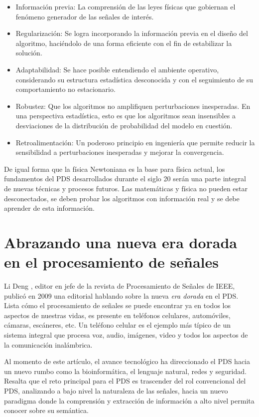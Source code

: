 \documentclass[11pt, twocolumn]{article}
\begin{document}
\begin{itemize}
    \item Información previa: La comprensión de las leyes físicas que gobiernan el fenómeno generador de las señales de interés.
    \item Regularización: Se logra incorporando la información previa en el diseño del algoritmo, haciéndolo de una forma eficiente con el fin de estabilizar la solución.
    \item Adaptabilidad: Se hace posible entendiendo el ambiente operativo, considerando su estructura estadística desconocida y con el seguimiento de su comportamiento no estacionario.
    \item Robustez: Que los algoritmos no amplifiquen perturbaciones inesperadas. En una perspectiva estadística, esto es que los algoritmos sean insensibles a desviaciones de la distribución de probabilidad del modelo en cuestión.
    \item Retroalimentación: Un poderoso principio en ingeniería que permite reducir la sensibilidad a perturbaciones inesperadas y mejorar la convergencia.
\end{itemize}

De igual forma que la física Newtoniana es la base para física actual, los fundamentos del PDS desarrollados durante el siglo 20 serán una parte integral de nuevas técnicas y procesos futuros. Las matemáticas y física no pueden estar desconectados, se deben probar los algoritmos con información real y se debe aprender de esta información.

\section{Abrazando una nueva era dorada en el procesamiento de señales}
Li Deng \cite{golden_age}, editor en jefe de la revista de Procesamiento de Señales de IEEE, publicó en 2009 una editorial hablando sobre la nueva \textit{era dorada} en el PDS. Lista cómo el procesamiento de señales se puede encontrar ya en todos los aspectos de nuestras vidas, es presente en teléfonos celulares, automóviles, cámaras, escáneres, etc. Un teléfono celular es el ejemplo más típico de un sistema integral que procesa voz, audio, imágenes, video y todos los aspectos de la comunicación inalámbrica.

Al momento de este artículo, el avance tecnológico ha direccionado el PDS hacia un nuevo rumbo como la bioinformática, el lenguaje natural, redes y seguridad. Resalta que el reto principal para el PDS es trascender del rol convencional del PDS, analizando a bajo nivel la naturaleza de las señales, hacia un nuevo paradigma donde la comprensión y extracción de información a alto nivel permita conocer sobre su semántica.
\end{document}
